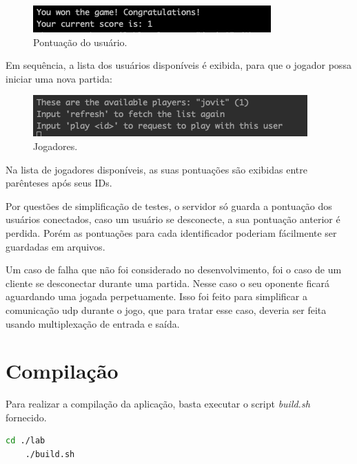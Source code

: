 \documentclass[12pt,a4paper]{report}
\begin{document}
\begin{figure}[H]
    \includegraphics[width=\linewidth]{points.png}
    \caption{Pontuação do usuário.}
\end{figure}

\bigbreak

Em sequência, a lista dos usuários disponíveis é exibida, para que o jogador possa iniciar uma nova partida:

\begin{figure}[H]
    \includegraphics[width=\linewidth]{players.png}
    \caption{Jogadores.}
\end{figure}

Na lista de jogadores disponíveis, as suas pontuações são exibidas entre parênteses após seus IDs.

Por questões de simplificação de testes, o servidor só guarda a pontuação dos usuários conectados, caso um usuário se desconecte, a sua pontuação anterior é perdida. Porém as pontuações para cada identificador poderiam fácilmente ser guardadas em arquivos.

\bigbreak

Um caso de falha que não foi considerado no desenvolvimento, foi o caso de um cliente se desconectar durante uma partida. Nesse caso o seu oponente ficará aguardando uma jogada perpetuamente. Isso foi feito para simplificar a comunicação udp durante o jogo, que para tratar esse caso, deveria ser feita usando multiplexação de entrada e saída.

\section{Compilação}

Para realizar a compilação da aplicação, basta executar o script \emph{build.sh} fornecido.

\begin{lstlisting}[language=bash]
    cd ./lab
    ./build.sh
\end{lstlisting}
\end{document}
